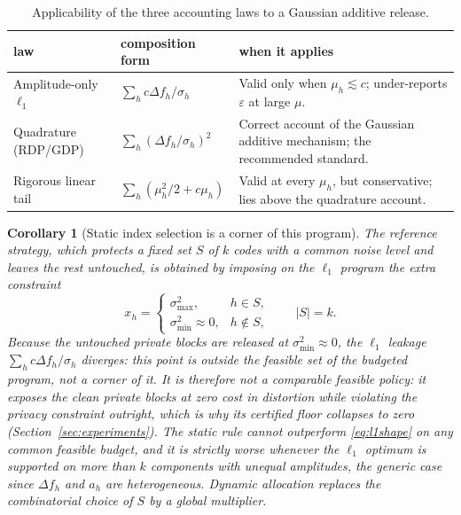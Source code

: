 \documentclass[10pt,twocolumn,letterpaper]{article}
\theoremstyle{plain}
\newtheorem{corollary}{Corollary}
\theoremstyle{definition}
\begin{document}
\begin{table}[h]
\centering\footnotesize
\setlength{\tabcolsep}{3.5pt}
\caption{Applicability of the three accounting laws to a Gaussian additive
release.}
\label{tab:laws}
\begin{tabular}{p{2.5cm}p{2.6cm}p{2.6cm}}
\toprule
law & composition form & when it applies \\
\midrule
Amplitude-only $\ell_1$ & $\sum_h c\Delta f_h/\sigma_h$ & Valid only when
$\mu_h\lesssim c$; under-reports $\varepsilon$ at large $\mu$. \\
Quadrature (RDP/GDP) & $\sum_h(\Delta f_h/\sigma_h)^{2}$ & Correct account
of the Gaussian additive mechanism; the recommended standard. \\
Rigorous linear tail & $\sum_h(\mu_h^2/2+c\mu_h)$ & Valid at every $\mu_h$,
but conservative; lies above the quadrature account. \\
\bottomrule
\end{tabular}
\end{table}

\begin{corollary}[Static index selection is a corner of this program]
\label{co:static}
The reference strategy, which protects a fixed set $S$ of $k$ codes with a common
noise level and leaves the rest untouched, is obtained by imposing on the
$\ell_1$ program the extra constraint
\begin{equation}
x_h=
\begin{cases}
\sigma_{\max}^{2}, & h\in S,\\
\sigma_{\min}^{2}\approx 0, & h\notin S,
\end{cases}
\qquad |S|=k.
\end{equation}
Because the untouched private blocks are released at $\sigma_{\min}^2\approx0$, the
$\ell_1$ leakage $\sum_h c\Delta f_h/\sigma_h$ diverges: this point is \emph{outside}
the feasible set of the budgeted program, not a corner of it. It is therefore
not a comparable feasible policy: it exposes the clean private blocks at zero
cost in distortion while violating the privacy constraint outright, which is
why its certified floor collapses to zero (Section~\ref{sec:experiments}). The
static rule cannot outperform \eqref{eq:l1shape} on any common feasible
budget, and it is strictly worse whenever the $\ell_1$ optimum is supported on
more than $k$ components with unequal amplitudes, the generic case since
$\Delta f_h$ and $a_h$ are heterogeneous. Dynamic allocation replaces the
combinatorial choice of $S$ by a global multiplier.
\end{corollary}
\end{document}
